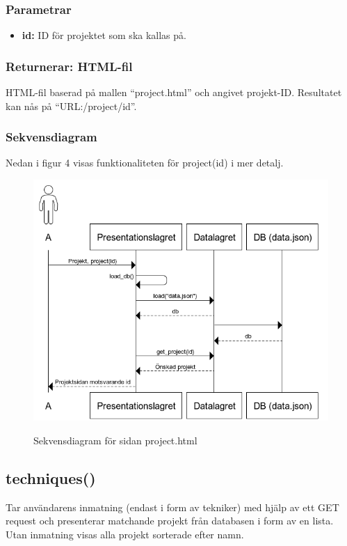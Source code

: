 \documentclass{TDP003mall}
\begin{document}
\subsubsection*{Parametrar}
\begin{itemize}
\item \textbf{id:} ID för projektet som ska kallas på.
\end{itemize}
\subsubsection*{Returnerar: HTML-fil}
HTML-fil baserad på mallen ``project.html'' och angivet projekt-ID. Resultatet kan nås på ``URL:/project/id''.
\subsubsection*{Sekvensdiagram}
Nedan i figur 4 visas funktionaliteten för project(id) i mer detalj.
\begin{figure}[!h]
  \centering
  \includegraphics[scale=0.5]{projekt.png}
  \label{Bild 4}
  \caption{Sekvensdiagram för sidan project.html}
\end{figure}


\newpage
\subsection{techniques()}
Tar användarens inmatning (endast i form av tekniker) med hjälp av ett GET request och presenterar matchande projekt från databasen i form av en lista. Utan inmatning
visas alla projekt sorterade efter namn.
\end{document}

